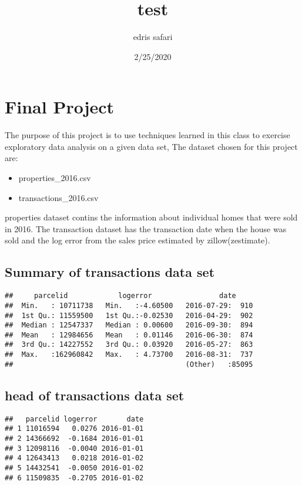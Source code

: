 \documentclass[
]{article}
\title{test}
\author{edris safari}
\date{2/25/2020}
\providecommand{\tightlist}{%
  \setlength{\itemsep}{0pt}\setlength{\parskip}{0pt}}
\begin{document}
\maketitle

\hypertarget{final-project}{%
\section{Final Project}\label{final-project}}

The purpose of this project is to use techniques learned in this class
to exercise exploratory data analysis on a given data set, The dataset
chosen for this project are:

\begin{itemize}
\tightlist
\item
  properties\_2016.csv
\item
  transactions\_2016.csv
\end{itemize}

properties dataset contins the information about individual homes that
were sold in 2016. The transaction dataset has the transaction date when
the house was sold and the log error from the sales price estimated by
zillow(zestimate).

\hypertarget{summary-of-transactions-data-set}{%
\subsection{Summary of transactions data
set}\label{summary-of-transactions-data-set}}

\begin{verbatim}
##     parcelid            logerror                date      
##  Min.   : 10711738   Min.   :-4.60500   2016-07-29:  910  
##  1st Qu.: 11559500   1st Qu.:-0.02530   2016-04-29:  902  
##  Median : 12547337   Median : 0.00600   2016-09-30:  894  
##  Mean   : 12984656   Mean   : 0.01146   2016-06-30:  874  
##  3rd Qu.: 14227552   3rd Qu.: 0.03920   2016-05-27:  863  
##  Max.   :162960842   Max.   : 4.73700   2016-08-31:  737  
##                                         (Other)   :85095
\end{verbatim}

\hypertarget{head-of-transactions-data-set}{%
\subsection{head of transactions data
set}\label{head-of-transactions-data-set}}

\begin{verbatim}
##   parcelid logerror       date
## 1 11016594   0.0276 2016-01-01
## 2 14366692  -0.1684 2016-01-01
## 3 12098116  -0.0040 2016-01-01
## 4 12643413   0.0218 2016-01-02
## 5 14432541  -0.0050 2016-01-02
## 6 11509835  -0.2705 2016-01-02
\end{verbatim}
\end{document}
